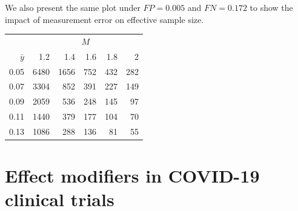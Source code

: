 \documentclass[12pt]{amsart}
\numberwithin{equation}{section}
\theoremstyle{plain}
\begin{document}
We also present the same plot under $FP = 0.005$ and $FN = 0.172$ to show the impact of measurement error on effective sample size.

\begin{table}[ht]
\centering
\begin{tabular}{rrrrrr}
& \multicolumn{5}{c}{$M$} \\ \cline{2-6}
$\bar y$ & 1.2 & 1.4 & 1.6 & 1.8 & 2 \\
  \hline
0.05 & 6480 & 1656 & 752 & 432 & 282 \\
  0.07 & 3304 & 852 & 391 & 227 & 149 \\
  0.09 & 2059 & 536 & 248 & 145 & 97 \\
  0.11 & 1440 & 379 & 177 & 104 & 70 \\
  0.13 & 1086 & 288 & 136 & 81 & 55 \\
   \hline
\end{tabular}
\end{table}

\section{Effect modifiers in COVID-19 clinical trials}
\end{document}
